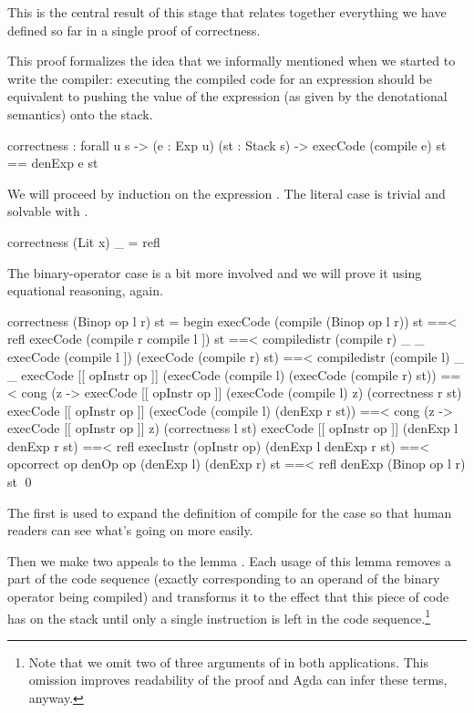 This is the central result of this stage that relates together everything we
have defined so far in a single proof of correctness.

This proof formalizes the idea that we informally mentioned when we started to
write the compiler: executing the compiled code for an expression should be
equivalent to pushing the value of the expression (as given by the denotational
semantics) onto the stack.

\label{sec:cor-correctness}\begin{code}
  correctness : forall {u s}
    -> (e : Exp u) (st : Stack s)
    -> execCode (compile e) st == denExp e \scons st
\end{code}

\noindent We will proceed by induction on the expression . The literal
case is trivial and solvable with .

\begin{code}
  correctness (Lit x) _ = refl
\end{code}

\noindent The binary-operator case is a bit more involved and we will prove it
using equational reasoning, again.

\begin{code}
  correctness (Binop op l r) st = begin
    execCode (compile (Binop op l r)) st
      ==< refl \>
    execCode (compile r \app compile l \app [[ opInstr op ]]) st
      ==< compile\-distr (compile r) _ _ \>
    execCode (compile l \app [[ opInstr op ]]) (execCode (compile r) st)
      ==< compile\-distr (compile l) _ _ \>
    execCode [[ opInstr op ]] (execCode (compile l) (execCode (compile r) st))
      ==< cong (\lam z -> execCode [[ opInstr op ]] (execCode (compile l) z) (correctness r st) \>
    execCode [[ opInstr op ]] (execCode (compile l) (denExp r \scons st))
      ==< cong (\lam z -> execCode [[ opInstr op ]] z) (correctness l st) \>
    execCode [[ opInstr op ]] (denExp l \scons denExp r \scons st)
      ==< refl \>
    execInstr (opInstr op) (denExp l \scons denExp r \scons st)
      ==< op\-correct op \>
    denOp op (denExp l) (denExp r) \scons st
      ==< refl \>
    denExp (Binop op l r) \scons st
    \qed
\end{code}

\noindent The first  is used to expand the definition of compile
for the  case so that human readers can see what's going on more
easily.

Then we make two appeals to the lemma . Each usage of this
lemma removes a part of the code sequence (exactly corresponding to an operand
of the binary operator being compiled) and transforms it to the effect that this
piece of code has on the stack until only a single instruction is left in the
code sequence.\footnote{Note that we omit two of three arguments of
 in both applications. This omission improves readability
of the proof and Agda can infer these terms, anyway.}


